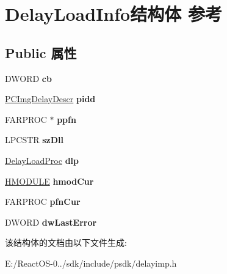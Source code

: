 \hypertarget{struct_delay_load_info}{}\section{Delay\+Load\+Info结构体 参考}
\label{struct_delay_load_info}
\subsection*{Public 属性}
\begin{DoxyCompactItemize}
\item 
\mbox{\label{struct_delay_load_info_a668588da087f78dad2abe976774e7c12}} 
D\+W\+O\+RD {\bfseries cb}
\item 
\mbox{\label{struct_delay_load_info_a296ce08705ef5df73385bbd048eb579d}} 
\hyperlink{struct_img_delay_descr}{P\+C\+Img\+Delay\+Descr} {\bfseries pidd}
\item 
\mbox{\label{struct_delay_load_info_a8ec1cfdd0e57a190815b9ad3482201dc}} 
F\+A\+R\+P\+R\+OC $\ast$ {\bfseries ppfn}
\item 
\mbox{\label{struct_delay_load_info_a7dc792099bfd42b06f105c049437077b}} 
L\+P\+C\+S\+TR {\bfseries sz\+Dll}
\item 
\mbox{\label{struct_delay_load_info_a819e713dc05e482789dbbe9ad110ce78}} 
\hyperlink{struct_delay_load_proc}{Delay\+Load\+Proc} {\bfseries dlp}
\item 
\mbox{\label{struct_delay_load_info_a4004e16ec154c4be2dd035d175bdaa8d}} 
\hyperlink{interfacevoid}{H\+M\+O\+D\+U\+LE} {\bfseries hmod\+Cur}
\item 
\mbox{\label{struct_delay_load_info_a6dd34956f883e390e8a35cfee2cec48d}} 
F\+A\+R\+P\+R\+OC {\bfseries pfn\+Cur}
\item 
\mbox{\label{struct_delay_load_info_ada5ec8ed705b50e71aa0a43eabad7dc0}} 
D\+W\+O\+RD {\bfseries dw\+Last\+Error}
\end{DoxyCompactItemize}


该结构体的文档由以下文件生成\+:\begin{DoxyCompactItemize}
\item 
E\+:/\+React\+O\+S-\/0../sdk/include/psdk/delayimp.\+h\end{DoxyCompactItemize}

